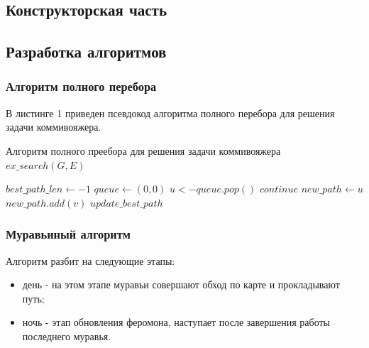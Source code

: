 \documentclass[a4paper,12pt]{article}
\begin{document}
    \newpage

    \begin{center}
        \section{Конструкторская часть}
        \subsection{Разработка алгоритмов}
    \end{center}
    \subsubsection{Алгоритм полного перебора}
    
    В листинге 1 приведен псевдокод алгоритма полного перебора для решения задачи коммивояжера.
\begin{algorithm}
		\caption{Алгоритм полного преебора для решения задачи коммивояжера $ex\_search(G, E)$}
		\begin{algorithmic}
			\State $best\_path\_len \gets -1$
			\State $queue \gets (0, 0)$
				\State $ u <- queue.pop() $
						\State $continue$
					\EndIf
					\State $ new\_path \gets u $
					\State $ new\_path.add(v) $
					\State $ update\_best\_path $
				\EndFor
			\EndWhile								
		\end{algorithmic}
	\end{algorithm}	
	
	\newpage
    \subsubsection{Муравьиный алгоритм}
    
    Алгоритм разбит на следующие этапы: 
		\begin{itemize}
			\item день - на этом этапе муравьи совершают обход по карте и прокладывают путь;
			\item ночь - этап обновления феромона, наступает после завершения работы последнего муравья.
		\end{itemize}	
\end{document}
